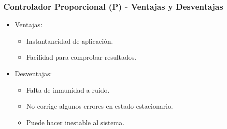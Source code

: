 \documentclass[aspectratio=169,handout]{beamer}
\theoremstyle{definition}
\theoremstyle{plain}
\theoremstyle{remark}
\begin{document}
\begin{frame}[<+->]\frametitle{Controlador Proporcional (P) - Ventajas y Desventajas}
  \begin{itemize}
    \item Ventajas:
    \begin{itemize}
      \item Instantaneidad de aplicación.
      \item Facilidad para comprobar resultados.
    \end{itemize}
    \item Desventajas:
    \begin{itemize}
      \item Falta de inmunidad a ruido.
      \item No corrige algunos errores en estado estacionario.
      \item Puede hacer inestable al sistema.
    \end{itemize}
  \end{itemize}
\end{frame}
\end{document}
